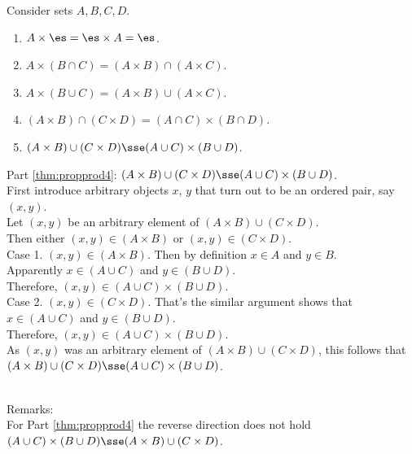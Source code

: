 \documentclass{report}
\begin{document}
\begin{thm}\label{thm:propprod}
  Consider sets $A, B, C, D$.
  \begin{enumerate}
  \item\label{thm:propprod5} $A \times \es = \es \times A = \es$.
  \item\label{thm:propprod1} $A \times (B \cap C) = (A\times B) \cap (A \times C)$.
  \item\label{thm:propprod2} $A \times (B \cup C) = (A \times B) \cup (A \times C)$.
  \item\label{thm:propprod3} $(A \times B) \cap (C \times D) = (A \cap C) \times (B \cap D)$.
  \item\label{thm:propprod4} $(A \times B) \cup (C \times D) \sse (A \cup C) \times (B \cup D)$.
  \end{enumerate}
\end{thm}
\begin{prf}
Part \ref{thm:propprod4}:  $(A \times B) \cup (C \times D) \sse (A \cup C) \times (B \cup D)$.\\
First introduce arbitrary objects $x$, $y$ that turn out to be an ordered pair, say $(x, y)$.\\
Let $(x,y)$ be an arbitrary element of $(A \times B) \cup (C \times D)$.\\
Then either $(x,y) \in (A \times B)$ or $(x,y) \in (C \times D)$.\\
\newline
Case 1. $(x,y) \in (A \times B)$. Then by definition $x \in A$ and $y \in B$.\\
Apparently $x \in (A \cup C)$ and $y \in (B \cup D)$.\\
Therefore, $(x,y) \in (A \cup C) \times (B \cup D)$.\\
\newline
Case 2. $(x,y) \in (C \times D)$. That's the similar argument shows that $x \in (A \cup C)$ and $y \in (B \cup D)$.\\
Therefore, $(x,y) \in (A \cup C) \times (B \cup D)$.\\
\newline
As $(x,y)$ was an arbitrary element of $(A \times B) \cup (C \times D)$, this follows that $(A \times B) \cup (C \times D) \sse (A \cup C) \times (B \cup D)$.

\Qed
\end{prf}
\\
Remarks:\\
For Part \ref{thm:propprod4} the reverse direction does not hold $(A \cup C) \times (B \cup D) \sse (A \times B) \cup (C \times D)$.\\
\end{document}
